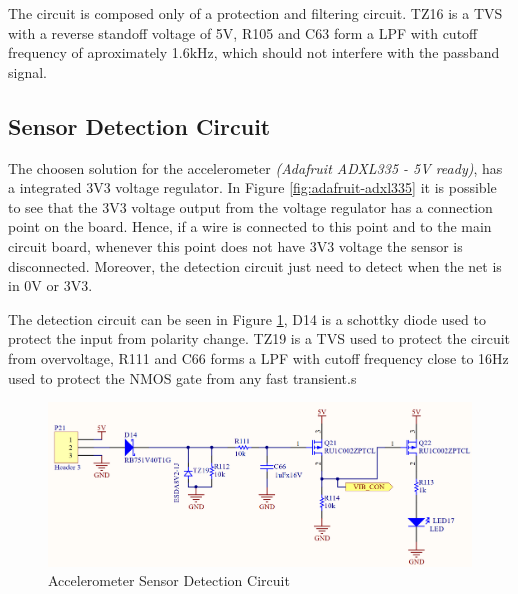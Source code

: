 	The circuit is composed only of a protection and filtering circuit. TZ16 is a TVS with a reverse standoff voltage of 5V, R105 and C63 form a LPF with cutoff frequency of aproximately 1.6kHz, which should not interfere with the passband signal.

\subsection{Sensor Detection Circuit}\label{ssec:accelerometer-sensor-detection-circuit}

	The choosen solution for the accelerometer \textit{(Adafruit ADXL335 - 5V ready)}, has a integrated 3V3 voltage regulator. In Figure \ref{fig:adafruit-adxl335} it is possible to see that the 3V3 voltage output from the voltage regulator has a connection point on the board. Hence, if a wire is connected to this point and to the main circuit board, whenever this point does not have 3V3 voltage the sensor is disconnected. Moreover, the detection circuit just need to detect when the net is in 0V or 3V3.
	\par
	The detection circuit can be seen in Figure \ref{fig:accelerometer-sensor-detection-circuit}, D14 is a schottky diode used to protect the input from polarity change. TZ19 is a TVS used to protect the circuit from overvoltage, R111 and C66 forms a LPF with cutoff frequency close to 16Hz used to protect the NMOS gate from any fast transient.s

	\begin{figure}[htbp]
		\centering
		\includegraphics[width=1\textwidth]{figuras/fig-accelerometer-sensor-detection-circuit.png}
		\caption{Accelerometer Sensor Detection Circuit}
		\label{fig:accelerometer-sensor-detection-circuit}
	\end{figure}